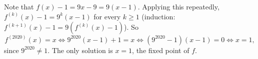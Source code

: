 Note that $f(x)-1=9x-9=9(x-1)$. Applying this repeatedly, $f^{(k)}(x)-1=9^k(x-1)$ for every $k\ge1$ (induction: $f^{(k+1)}(x)-1=9\left(f^{(k)}(x)-1\right)$). So
\[f^{(2020)}(x)=x\iff9^{2020}(x-1)+1=x\iff\left(9^{2020}-1\right)(x-1)=0\iff x=1,\]
since $9^{2020}\ne1$. The only solution is $x=\boxed{1}$, the fixed point of $f$.
